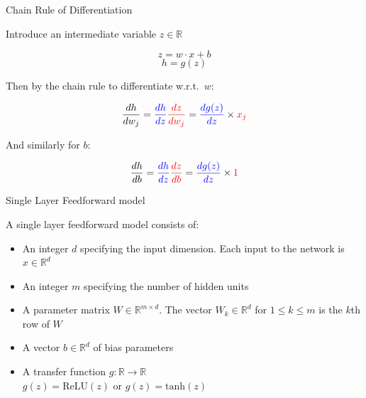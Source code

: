 \begin{frame}{Chain Rule of Differentiation}
\begin{block}{}
Introduce an intermediate variable $z \in \mathbb{R}$ 

\[ z = w \cdot x + b \]
\[ h = g(z) \]

Then by the chain rule to differentiate w.r.t.\ $w$:

\[ \frac{dh}{dw_j} = \textcolor{blue}{\frac{dh}{dz}} \textcolor{red}{\frac{dz}{dw_j}} = \textcolor{blue}{\frac{dg(z)}{dz}} \times \textcolor{red}{x_j}\]

\pause
And similarly for $b$:

\[ \frac{dh}{db} = \textcolor{blue}{\frac{dh}{dz}} \textcolor{red}{\frac{dz}{db}}= \textcolor{blue}{\frac{dg(z)}{dz}} \times \textcolor{red}{1}\]

\end{block}
\end{frame}

\begin{frame}{Single Layer Feedforward model}
\begin{block}{A single layer feedforward model consists of:}
\begin{itemize}[<+->]
\item An integer $d$ specifying the input dimension. Each input to the network is $x \in \mathbb{R}^d$
\item An integer $m$ specifying the number of hidden units
\item A parameter matrix $W \in \mathbb{R}^{m \times d}$. The vector $W_k \in \mathbb{R}^d$ for $1 \leq k \leq m$ is the $k$th row of $W$
\item A vector $b \in \mathbb{R}^d$ of bias parameters
\item A transfer function $g : \mathbb{R} \rightarrow \mathbb{R}$\\
$g(z) = \textrm{ReLU}(z)$ or $g(z) = \textrm{tanh}(z)$
\end{itemize}
\end{block}
\end{frame}

